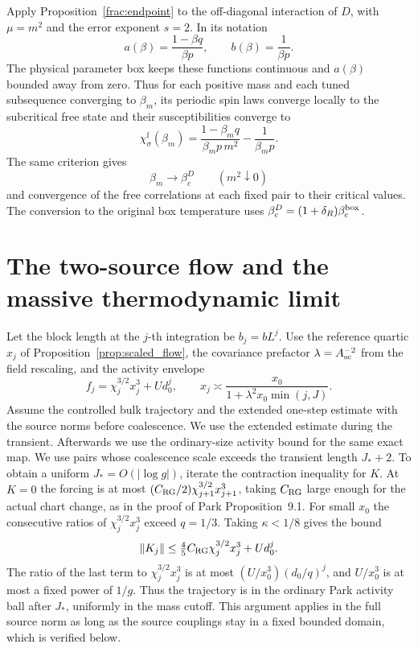 \documentclass[11pt]{article}
\begin{document}
Apply Proposition~\ref{frac:endpoint} to the off-diagonal
interaction of \(D\), with \(\mu=m^2\) and the error exponent
\(s=2\). In its notation
\[
 a(\beta)=\frac{1-\beta q}{\beta p},\qquad
 b(\beta)=\frac1{\beta p}.
\]
The physical parameter box keeps these functions continuous
and \(a(\beta)\) bounded away from zero. Thus for each positive
mass and each tuned subsequence converging to \(\beta_m\), its
periodic spin laws converge locally to the subcritical free
state and their susceptibilities converge to
\begin{equation}\label{eq:physical_suscept}
 \chi_\sigma^{\mathrm f}(\beta_m)
   =\frac{1-\beta_m q}{\beta_m p\,m^2}-\frac1{\beta_m p}.
\end{equation}
The same criterion gives
\begin{equation}\label{eq:tuned-critical-endpoint}
 \beta_m\longrightarrow\beta_c^D\qquad(m^2\downarrow0)
\end{equation}
and convergence of the free correlations at each fixed pair
to their critical values. The conversion to the original box
temperature uses \(\beta_c^D=(1+\delta_R)\beta_c^{\rm box}\).

\section{The two-source flow and the massive thermodynamic limit}

Let the block length at the \(j\)-th integration be \(b_j=bL^j\).
Use the reference quartic \(x_j\) of
Proposition~\ref{prop:scaled_flow}, the covariance prefactor
\(\lambda=A_{\rm sc}^{-2}\) from the field rescaling,
and the activity envelope
\[
 f_j=\chi_j^{3/2}x_j^3+Ud_0^j,\qquad
 x_j\asymp \frac{x_0}{1+\lambda^2x_0\min(j,J)} .
\]
Assume the controlled bulk trajectory and the extended one-step
estimate with the source norms before coalescence. We use the
extended estimate during the transient. Afterwards we use the
ordinary-size activity bound for the same exact map. We use pairs
whose coalescence scale exceeds the transient length \(J_*+2\).
To obtain a uniform \(J_*=O(|\log g|)\), iterate the contraction
inequality for \(K\). At \(K=0\) the forcing is at most
\((C_{\rm RG}/2)\chi_{j+1}^{3/2}x_{j+1}^3\), taking
\(C_{\rm RG}\) large enough for the actual chart change, as
in the proof of Park Proposition~9.1. For small \(x_0\) the consecutive
ratios of \(\chi_j^{3/2}x_j^3\) exceed \(q=1/3\).
Taking \(\kappa<1/8\) gives the bound
\[
 \|K_j\|\le \tfrac45 C_{\rm RG}\chi_j^{3/2}x_j^3+U d_0^j .
\]
The ratio of the last term to \(\chi_j^{3/2}x_j^3\) is at most
\((U/x_0^3)(d_0/q)^j\), and \(U/x_0^3\) is at most a fixed
power of \(1/g\). Thus the trajectory is in the ordinary
Park activity ball after \(J_*\), uniformly in the mass cutoff.
This argument applies in the full source norm as long as the
source couplings stay in a fixed bounded domain, which is
verified below.
\end{document}
